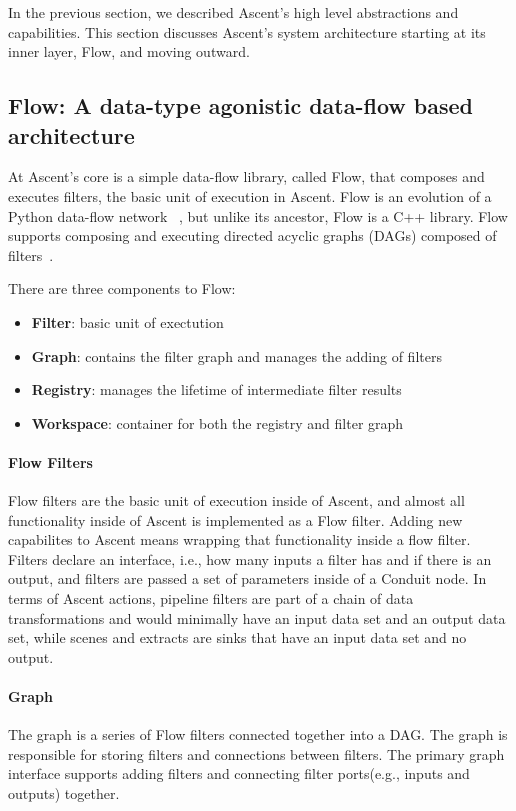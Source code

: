 In the previous section, we described Ascent's high level abstractions and
capabilities.
%
This section discusses Ascent's system architecture starting at its inner layer, Flow,
and moving outward.

\subsection{Flow: A data-type agonistic data-flow based architecture}
At Ascent's core is a simple data-flow library, called Flow, that
composes and executes filters, the basic unit of execution in Ascent.
%
Flow is an evolution of a Python data-flow network
~\cite{flow_reference}, but unlike its ancestor, Flow is a C++
library.
%
Flow supports composing and executing directed acyclic graphs
(DAGs) composed of filters~\cite{LarsenAscent}.

There are three components to Flow:
\begin{itemize}
  \item \textbf{Filter}: basic unit of exectution
  \item \textbf{Graph}: contains the filter graph and manages the adding of filters
  \item \textbf{Registry}: manages the lifetime of intermediate filter results
  \item \textbf{Workspace}: container for both the registry and filter graph
\end{itemize}

\paragraph{Flow Filters}
Flow filters are the basic unit of execution inside of Ascent, and
almost all functionality inside of Ascent is implemented as a Flow filter.
%
Adding new capabilites to Ascent means wrapping that functionality inside
a flow filter.
%
Filters declare an interface, i.e., how many inputs a filter has and
if there is an output, and filters are passed a set of parameters inside
of a Conduit
node.
%
In terms of Ascent actions, pipeline filters are part of a chain of
data transformations and would minimally have an input
data set and an output data set, while scenes and extracts
are sinks that have an input data set and no output.
%

\paragraph{Graph}
The graph is a series of Flow filters connected together into
a DAG.
%
The graph is responsible for storing filters and connections
between filters.
%
The primary graph interface supports adding filters and connecting
filter ports(e.g., inputs and outputs) together.

